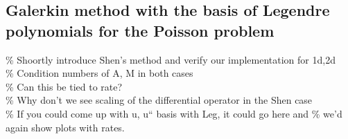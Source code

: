 \documentclass[a4paper,10pt]{article}
\begin{document}
  \subsection{Galerkin method with the basis of Legendre polynomials for the
  Poisson problem}
  \% Shoortly introduce Shen's method and verify our implementation for 1d,2d\\
  \% Condition numbers of A, M in both cases\\
  \% Can this be tied to rate?\\
  \% Why don't we see scaling of the differential operator in the Shen case\\
  \% If you could come up with u, u`` basis with Leg, it could go here and
  \% we'd again show plots with rates.
 
\end{document}
